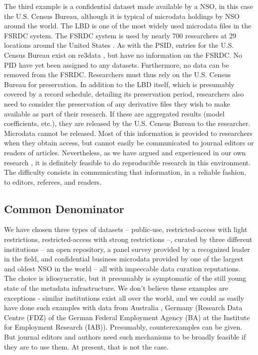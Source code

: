 The third example is a confidential dataset made available by a \ac{NSO}, in this case the U.S. Census Bureau, although it is typical of microdata holdings by \ac{NSO} around the world. The \ac{LBD} \parencite{LBD,MirandaJarmin2002} is one of the most widely used microdata files in the \ac{FSRDC} system. The \ac{FSRDC} system is used by nearly 700 researchers at 29 locations around the United States \parencite{u.s._census_bureau_center_2018}. As with the \ac{PSID}, entries for the U.S. Census Bureau exist on re3data \parencite{Re3data-uscb}, but have no information on the \ac{FSRDC}. No \ac{PID} have yet been assigned to any datasets. Furthermore, no data can be removed from the \ac{FSRDC}. Researchers must thus rely on the U.S. Census Bureau for preservation. In addition to the \ac{LBD} itself, which is presumably covered by a record schedule, detailing its preservation period, researchers also need to consider the preservation of any derivative files they wish to make available as part of their research. If these are aggregated results (model coefficients, etc.), they are released by the U.S. Census Bureau to the researcher. Microdata cannot be released. Most of this information is provided to researchers when they obtain access, but cannot easily be communicated to journal editors or readers of articles. Nevertheless, as we have argued  \parencite{Lagoze2017-qv} and experienced in our own research \parencite{AbowdVilhuber2005,AbowdEtAl2009c,McKinneyEtAl:submitted:2017}, it is definitely feasible to do reproducible research in this environment. The difficulty consists in communicating that information, in a reliable fashion, to editors, referees, and readers.




\subsection{Common Denominator}
We have chosen three types of datasets -- public-use, restricted-access with light restrictions, restricted-access with strong restrictions --, curated by three different institutions -- an open repository, a panel survey  provided by a recognized leader in the field, and confidential business microdata provided by one of the largest and oldest \ac{NSO} in the world -- all with impeccable data curation reputations. The choice is idiosyncratic, but it presumably is symptomatic of the still young state of the metadata infrastructure. We don't believe these examples are exceptions - similar institutions exist all over the world, and we could as easily have done such examples with data from Australia \parencite{PTKLYP_2018}, Germany (Research Data Centre (FDZ) of the German Federal Employment Agency (BA) at the Institute for Employment Research (IAB)). Presumably, counterexamples can be given. But journal editors and authors need such mechanisms to be broadly feasible if they are to use them. At present, that is not the case.

